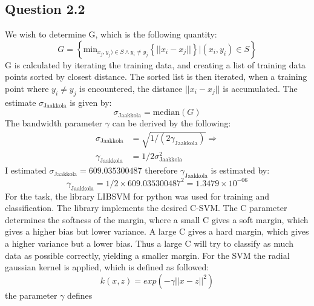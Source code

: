 \documentclass{article}
\begin{document}
\subsection{Question 2.2}
We wish to determine G, which is the following quantity:
\begin{equation}
G = \left\lbrace \text{min}_{x_j,y_j) \in S \wedge y_i \neq y_j}
\left\lbrace || x_i - x_j || \right\rbrace | (x_i,y_i) \in S \right\rbrace 
\end{equation}
G is calculated by iterating the training data, and creating a list of training data points sorted by closest distance. The sorted list is then iterated, when a training point where $y_i \neq y_j$ is encountered, the distance $||x_i-x_j||$ is accumulated. The estimate $\sigma_{\text{Jaakkola}}$ is given by:
\begin{equation}
\sigma_{\text{Jaakkola}} = \text{median}(G)
\end{equation}
The bandwidth parameter $\gamma$ can be derived by the following:
\begin{align*}
\sigma_{\text{Jaakkola}} &= \sqrt{1 / (2\gamma_{\text{Jaakkola}})} \Rightarrow \\
\gamma_{\text{Jaakkola}} &= 1/2\sigma^2_{\text{Jaakkola}}
\end{align*}
I estimated $\sigma_{\text{Jaakkola}} = 609.035300487$
therefore $\gamma_{\text{Jaakkola}}$ is estimated by:
\begin{equation}
\gamma_{\text{Jaakkola}} = 1 / 2 \times 609.035300487^2 = 1.3479 \times 10^{-06}
\end{equation}
For the task, the library LIBSVM for python was used for training and classification. The library implements the desired C-SVM. The C parameter determines the softness of the margin, where a small C gives a soft margin, which gives a higher bias but lower variance. A large C gives a hard margin, which gives a higher variance but a lower bias. Thus a large C will try to classify as much data as possible correctly, yielding a smaller margin. For the SVM the radial gaussian kernel is applied, which is defined as followed:
\begin{equation}
k(x,z) = exp(-\gamma || x - z ||^2)
\end{equation}
the parameter $\gamma$ defines 
\end{document}
